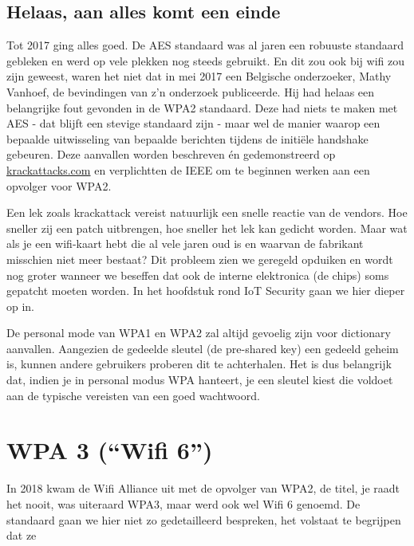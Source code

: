 \documentclass[
  10pt,
  dutch,
  paper=a4,
  ,captions=tableheading
]{scrbook}
\begin{document}
\subsection{Helaas, aan alles komt een
einde}\label{helaas-aan-alles-komt-een-einde}

Tot 2017 ging alles goed. De AES standaard was al jaren een robuuste
standaard gebleken en werd op vele plekken nog steeds gebruikt. En dit
zou ook bij wifi zou zijn geweest, waren het niet dat in mei 2017 een
Belgische onderzoeker, Mathy Vanhoef, de bevindingen van z'n onderzoek
publiceerde. Hij had helaas een belangrijke fout gevonden in de WPA2
standaard. Deze had niets te maken met AES - dat blijft een stevige
standaard zijn - maar wel de manier waarop een bepaalde uitwisseling van
bepaalde berichten tijdens de initiële handshake gebeuren. Deze
aanvallen worden beschreven én gedemonstreerd op
\href{HTTPS://www.krackattacks.com/}{krackattacks.com} en verplichtten
de IEEE om te beginnen werken aan een opvolger voor WPA2.

\begin{tipblock}
Een lek zoals krackattack vereist natuurlijk een snelle reactie van de
vendors. Hoe sneller zij een patch uitbrengen, hoe sneller het lek kan
gedicht worden. Maar wat als je een wifi-kaart hebt die al vele jaren
oud is en waarvan de fabrikant misschien niet meer bestaat? Dit probleem
zien we geregeld opduiken en wordt nog groter wanneer we beseffen dat
ook de interne elektronica (de chips) soms gepatcht moeten worden. In
het hoofdstuk rond IoT Security gaan we hier dieper op in.
\end{tipblock}

\begin{tipblock}
De personal mode van WPA1 en WPA2 zal altijd gevoelig zijn voor
dictionary aanvallen. Aangezien de gedeelde sleutel (de pre-shared key)
een gedeeld geheim is, kunnen andere gebruikers proberen dit te
achterhalen. Het is dus belangrijk dat, indien je in personal modus WPA
hanteert, je een sleutel kiest die voldoet aan de typische vereisten van
een goed wachtwoord.
\end{tipblock}

\section{WPA 3 (``Wifi 6'')}\label{wpa-3-wifi-6}

In 2018 kwam de Wifi Alliance uit met de opvolger van WPA2, de titel, je
raadt het nooit, was uiteraard WPA3, maar werd ook wel Wifi 6 genoemd.
De standaard gaan we hier niet zo gedetailleerd bespreken, het volstaat
te begrijpen dat ze
\end{document}
